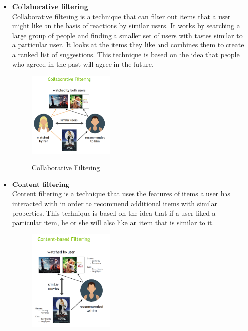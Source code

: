\begin{itemize}
    \item \textbf{Collaborative filtering} \\ Collaborative filtering is a technique that can filter out items that a user might like on the basis of reactions by similar users. It works by searching a large group of people and finding a smaller set of users with tastes similar to a particular user. It looks at the items they like and combines them to create a ranked list of suggestions. This technique is based on the idea that people who agreed in the past will agree in the future.
    \begin{figure}[H]
        \centering
        \includegraphics[width=0.4\textwidth]{assets/collaborative_filtering.png}
        \caption{Collaborative Filtering}
        \label{fig:collaborative-filtering}
        \cite{NvidiaRecSys}
    \end{figure}
    \item \textbf{Content filtering}\\Content filtering is a technique that uses the features of items a user has interacted with in order to recommend additional items with similar properties. This technique is based on the idea that if a user liked a particular item, he or she will also like an item that is similar to it. 
    \begin{figure}[H]
        \centering
        \includegraphics[width=0.4\textwidth]{assets/content_based_filtering.png}

\end{figure}
\end{itemize}
